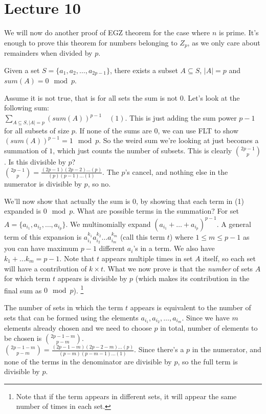 \documentclass[a4paper,10pt]{article}
\theoremstyle{definition} %
\begin{document}
    \section{Lecture 10}

    We will now do another proof of EGZ theorem for the case where $n$ is prime. It's
    enough to prove this theorem for numbers belonging to $Z_p$, as we only care about 
    remainders when divided by $p$.

    Given a set $S = \{a_1, a_2, \dots, a_{2p-1}\}$, there exists a subset $A \subseteq S$,
    $|A| = p$ and $sum(A) = 0 \mod p$.

    Assume it is not true, that is for all sets the sum is not 0. Let's look at the following sum: \\
    $\sum_{A \subseteq S, |A|=p} (sum(A))^{p-1} \quad (1)$. This is just adding the sum power $p-1$ for all 
    subsets of size $p$. If none of the sums are 0, we can use FLT to show $(sum(A))^{p-1} = 1 \mod p$.
    So the weird sum we're looking at just becomes a summation of $1$, which just counts the number
    of subsets. This is clearly $\binom{2p-1}{p}$. Is this divisible by $p$? \\
    $\binom{2p-1}{p} = \frac{(2p-1)(2p-2)\dots(p)}{(p)(p-1)\dots(1)}$. The $p$'s cancel,
    and nothing else in the numerator is divisible by $p$, so no.

    We'll now show that actually the sum is $0$, by showing that each term in (1) expanded
    is $0 \mod p$. What are possible terms in the summation? For set $A = \{a_{i_1}, a_{i_2},
    \dots, a_{i_p}\}$. We multinomially expand $(a_{i_1} + \dots + a_{i_p})^{p-1}$. A general
    term of this expansion is $a_{i_1}^{k_1}a_{i_2}^{k_2} \dots a_{i_m}^{k_m}$ (call this term $t$) where 
    $1 \leq m \leq p-1$ as you can have maximum $p-1$ different $a_i$'s in a term. We also have 
    $k_1 + \dots k_m = p-1$. Note that $t$ appears multiple times in set $A$ itself, so each 
    set will have a contribution of $k \times t$. What we now prove is that the \emph{number}
    of sets $A$ for which term $t$ appears is divisible by $p$ (which makes its contribution in 
    the final sum as $0 \mod p$).
    \footnote{
    Note that if the term appears in different sets, it will appear the same number of times in 
    each set.
    }
 
    The number of sets in which the term $t$ appears is equivalent to the number of sets that 
    can be formed using the elements $a_{i_1}, a_{i_2}, \dots, a_{i_m}$. Since we have $m$
    elements already chosen and we need to choose $p$ in total, number of elements to be chosen 
    is $\binom{2p-1-m}{p-m}$. \\
    $\binom{2p-1-m}{p-m} = \frac{(2p-1-m)(2p-2-m)\dots(p)}{(p-m)(p-m-1)\dots(1)}$. Since
    there's a $p$ in the numerator, and none of the terms in the denominator are divisible
    by $p$, so the full term is divisible by $p$. 
\end{document}
